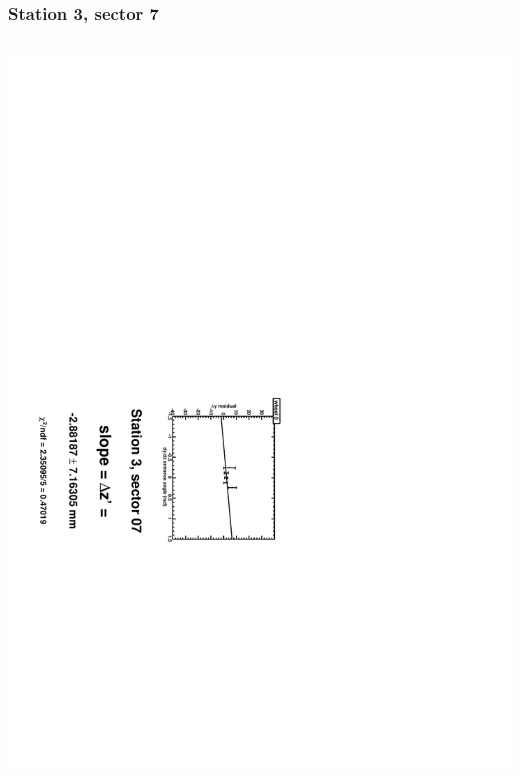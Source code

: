 \documentclass[compress]{beamer}
\begin{document}
\begin{frame}
\frametitle{Station 3, sector 7}
\begin{columns}
\includegraphics[height=\linewidth, angle=90]{zfits/zfit_3_07.pdf}


\end{columns}
\end{frame}
\end{document}
